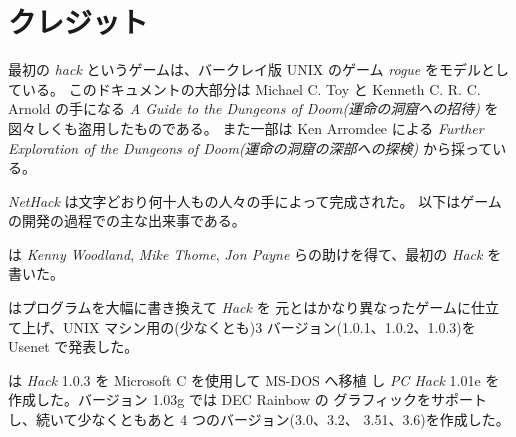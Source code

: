 \section{クレジット}
最初の {\it hack\/} というゲームは、バークレイ版
UNIX のゲーム {\it rogue\/} をモデルとしている。
このドキュメントの大部分は Michael C. Toy と Kenneth C. R. C. Arnold の手になる
{\it A Guide to the Dungeons of Doom(運命の洞窟への招待)} を図々しくも盗用したものである。
また一部は Ken Arromdee による
{\it Further Exploration of the Dungeons of Doom(運命の洞窟の深部への探検)}
から採っている。

{\it NetHack\/} は文字どおり何十人もの人々の手によって完成された。
以下はゲームの開発の過程での主な出来事である。

\bigskip
 は {\it Kenny Woodland}, {\it Mike Thome}, {\it Jon Payne}
らの助けを得て、最初の {\it Hack\/} を書いた。

\medskip
 はプログラムを大幅に書き換えて {\it Hack\/} を
元とはかなり異なったゲームに仕立て上げ、UNIX
マシン用の(少なくとも)3 バージョン(1.0.1、1.0.2、1.0.3)を Usenet で発表した。

\medskip
 は {\it Hack\/} 1.0.3 を Microsoft C を使用して MS-DOS へ移植
し {\it PC Hack\/} 1.01e を作成した。バージョン 1.03g では DEC Rainbow の
グラフィックをサポートし、続いて少なくともあと 4 つのバージョン(3.0、3.2、
3.51、3.6)を作成した。

